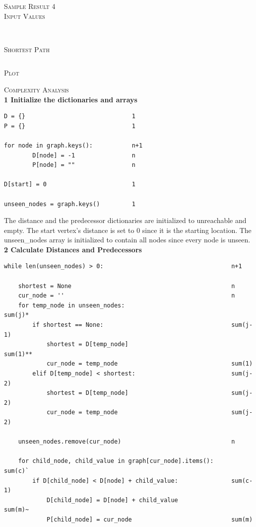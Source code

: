 \documentclass[pdftex,12pt,a4paper]{article}
\newcommand{\nspace}{\\[0.25cm]}
\newcommand{\lspace}{\\[0.50cm]}
\begin{document}
\textsc{\large Sample Result 4} \hfill \nspace

\textsc{Input Values} \hfill \nspace

\begin{verbatim}
\end{verbatim}

\hfill \nspace
\textsc{Shortest Path} \hfill \nspace

\begin{verbatim}
\end{verbatim}


\textsc{Plot} \hfill \nspace

\begin{figure}[h!]
  \centering
\end{figure}

\textsc{\Large Complexity Analysis} \hfill \nspace

{\bf \large 1 Initialize the dictionaries and arrays}
\begin{verbatim}
D = {}								1
P = {}								1

for node in graph.keys():			n+1
        D[node] = -1				n
        P[node] = ""				n

D[start] = 0						1

unseen_nodes = graph.keys()			1
\end{verbatim}

The distance and the predecessor dictionaries are initialized to unreachable and empty. The start vertex's distance is set to 0 since it is the starting location. The unseen_nodes array is initialized to contain all nodes since every node is unseen.\lspace

{\bf \large 2 Calculate Distances and Predecessors}
\begin{verbatim}
while len(unseen_nodes) > 0:									n+1

    shortest = None												n
    cur_node = ''												n
    for temp_node in unseen_nodes:								sum(j)*
        if shortest == None:									sum(j-1)
            shortest = D[temp_node]								sum(1)**
            cur_node = temp_node								sum(1)
        elif D[temp_node] < shortest:							sum(j-2)
            shortest = D[temp_node]								sum(j-2)
            cur_node = temp_node								sum(j-2)

    unseen_nodes.remove(cur_node)								n

    for child_node, child_value in graph[cur_node].items():		sum(c)`
        if D[child_node] < D[node] + child_value:				sum(c-1)
            D[child_node] = D[node] + child_value				sum(m)~
            P[child_node] = cur_node							sum(m)
\end{verbatim}
\end{document}
